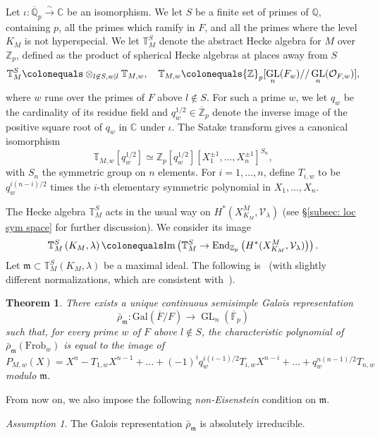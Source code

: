 \documentclass{amsart}
\newtheorem{thm}[subsubsection]{Theorem}
\theoremstyle{remark}
\newtheorem{assumption}[subsubsection]{Assumption}
\numberwithin{equation}{subsection}
\def\C{\CC}
\newcommand{\F}{\FF}
\newcommand{\Q}{\QQ}
\newcommand{\Z}{\ZZ}
\newcommand{\m}{\frakm}
\newcommand{\CC}{{\mathbb C}}
\newcommand{\FF}{{\mathbb F}}
\newcommand{\QQ}{{\mathbb Q}}
\newcommand{\ZZ}{{\mathbb Z}}
\newcommand{\cO}{{\mathcal O}}
\newcommand{\cV}{{\mathcal V}}
\newcommand{\frakm}{\mathfrak{m}}
\DeclareMathOperator{\GL}{GL}
\newcommand{\Frob}{\mathrm{Frob}}
\newcommand{\toisom}{\xrightarrow{\sim}}
\newcommand{\defeq}{\colonequals}
\renewcommand{\(}{\left(}
\renewcommand{\)}{\right)}
\begin{document}
Let $\iota\colon \overline{\Q}_p\toisom \C$ be an isomorphism. We let $S$ be a finite set of primes of $\Q$, containing $p$, all the primes which ramify in $F$, and all the primes where the level $K_M$ is not hyperspecial. We let $\mathbb{T}^S_{M}$ denote the abstract Hecke algebra for $M$ over $\Z_p$, defined as the product of spherical Hecke algebras at places away from $S$
\[
\mathbb{T}^S_{M}\defeq  \otimes_{l\not\in S,w\mid l} \mathbb{T}_{M,w}, \quad \mathbb{T}_{M,w} 
\defeq \Z_p[\GL_n(F_w)//\GL_n(\cO_{F,w})],
\]
where $w$ runs over the primes of $F$ above $l\not\in S$. 
For such a prime $w$, we let $q_w$ be the cardinality of its residue field and $q_{w}^{1/2}\in \overline{\Z}_p$ denote the inverse image of the positive 
square root of $q_{w}$ in $\C$ under $\iota$. The Satake transform gives a canonical isomorphism
\[
\mathbb{T}_{M,w}[q^{1/2}_{w}]\simeq \Z_p[q_{w}^{1/2}][X^{\pm 1}_1,\dots, X^{\pm 1}_{n}]^{S_{n}},
\]
with $S_n$ the symmetric group on $n$ elements.
For $i=1,\dots, n$, define $T_{i,w}$ to be $q_w^{i(n-i)/2}$ times the $i$-th elementary symmetric polynomial in $X_1,\dots,X_{n}$.

\medskip

The Hecke algebra $\mathbb{T}^S_{M}$ acts in the usual way on $H^*(X^M_{K_M}, \cV_\lambda)$ (see \S \ref{subsec: loc sym space} for further discussion). We consider its image 
\[
\mathbb{T}^S_{M}\left(K_M,\lambda\right)\defeq \mathrm{Im}\left(\mathbb{T}^S_{M}\to \mathrm{End}_{\Z_p}\left(H^*(X^M_{K_M}, \cV_\lambda)\right)\right).
\] 
Let $\m\subset \mathbb{T}^S_{M}\left(K_M,\lambda\right)$ be a maximal ideal. The following is~\cite[Cor.~5.4.3]{scholze-galois} 
(with slightly different normalizations, which are consistent with~\cite{newton-thorne}).

\begin{thm}\label{residual Galois rep} There exists a unique continuous semisimple Galois representation 
\[
\bar{\rho}_{\m}\colon \mathrm{Gal}(\overline{F}/F)\to \GL_n(\overline{\F}_p)
\]
such that, for every prime $w$ of $F$ above $l\not\in S$, the characteristic polynomial of $\bar{\rho}_{\m}(\Frob_w)$ is equal to the image of
\[
P_{M,w}(X) = X^{n} - T_{1,w}X^{n-1}+\dots + (-1)^iq_{w}^{i(i-1)/2}T_{i,w}X^{n-i} +\dots + q_{w}^{n(n-1)/2}T_{n,w}
\]
modulo $\m$. 
\end{thm}

\noindent From now on, we also impose the following \emph{non-Eisenstein} condition on $\m$. 

\begin{assumption}\label{non-Eisenstein} The Galois representation $\bar{\rho}_{\m}$ is absolutely irreducible. 
\end{assumption} 
\end{document}

